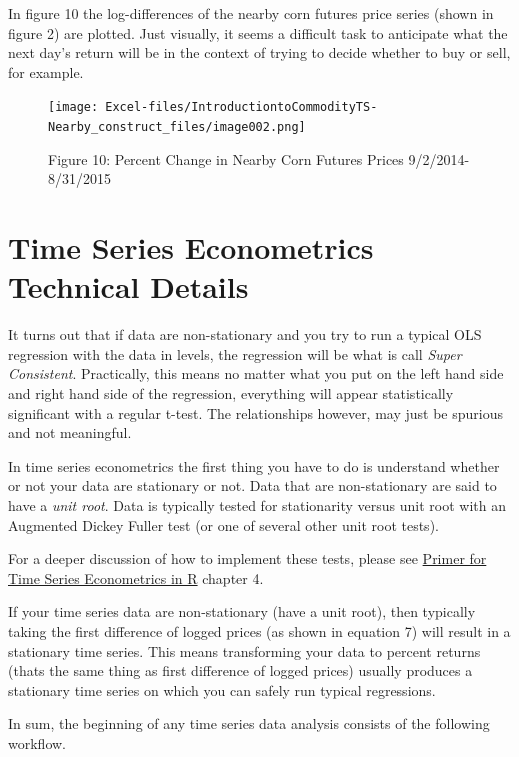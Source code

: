 \documentclass[
]{book}
\begin{document}
In figure 10 the log-differences of the nearby corn futures price series (shown in figure 2) are plotted. Just visually, it seems a difficult task to anticipate what the next day's return will be in the context of trying to decide whether to buy or sell, for example.

\begin{figure}
\centering
\texttt{[image: Excel-files/IntroductiontoCommodityTS-Nearby\_construct\_files/image002.png]}
\caption{Figure 10: Percent Change in Nearby Corn Futures Prices 9/2/2014-8/31/2015}
\end{figure}

\hypertarget{time-series-econometrics-technical-details}{%
\section{Time Series Econometrics Technical Details}\label{time-series-econometrics-technical-details}}

It turns out that if data are non-stationary and you try to run a typical OLS regression with the data in levels, the regression will be what is call \emph{Super Consistent}. Practically, this means no matter what you put on the left hand side and right hand side of the regression, everything will appear statistically significant with a regular t-test. The relationships however, may just be spurious and not meaningful.

In time series econometrics the first thing you have to do is understand whether or not your data are stationary or not. Data that are non-stationary are said to have a \emph{unit root}. Data is typically tested for stationarity versus unit root with an Augmented Dickey Fuller test (or one of several other unit root tests).

For a deeper discussion of how to implement these tests, please see \href{http://mindymallory.com/R-Companion-Price-Analysis/}{Primer for Time Series Econometrics in R} chapter 4.

If your time series data are non-stationary (have a unit root), then typically taking the first difference of logged prices (as shown in equation 7) will result in a stationary time series. This means transforming your data to percent returns (thats the same thing as first difference of logged prices) usually produces a stationary time series on which you can safely run typical regressions.

In sum, the beginning of any time series data analysis consists of the following workflow.
\end{document}
